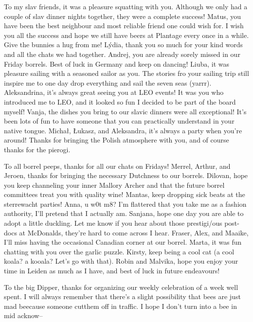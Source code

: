 \begin{thesisacknowledgements}
    To my slav friends, it was a pleasure squatting with you. Although we only had a couple of slav dinner nights together, they were a complete success! Matus, you have been the best neighbour and most reliable friend one could wish for. I wish you all the success and hope we still have beers at Plantage every once in a while. Give the bunnies a hug from me! L\'ydia, thank you so much for your kind words and all the chats we had together. Andrej, you are already sorely missed in our Friday borrels. Best of luck in Germany and keep on dancing! Liuba, it was pleasure sailing with a seasoned sailor as you. The stories fro your sailing trip still inspire me to one day drop everything and sail the seven seas (yarrr). Aleksandrina, it's always great seeing you at LEO events! It was you who introduced me to LEO, and it looked so fun I decided to be part of the board myself! Vanja, the dishes you bring to our slavic dinners were all exceptional! It's been lots of fun to have someone that you can practically understand in your native tongue.  Micha\l{}, \L{}ukasz, and Aleksandra, it's always a party when you're around! Thanks for bringing the Polish atmosphere with you, and of course thanks for the pierogi.

    To all borrel peeps, thanks for all our chats on Fridays! Merrel, Arthur, and Jeroen, thanks for bringing the necessary Dutchness to our borrels. Dilovan, hope you keep channeling your inner Mallory Archer and that the future borrel committees treat you with quality wine! Mantas, keep dropping sick beats at the sterrewacht parties! Anna, u w0t m8? I'm flattered that you take me as a fashion authority, I'll pretend that I actually am. Sanjana, hope one day you are able to adopt a little duckling. Let me know if you hear about those prestigi/ous post-docs at McDonalds, they're hard to come across I hear. Fraser, Alex, and Maaike, I'll miss having the occasional Canadian corner at our borrel. Marta, it was fun chatting with you over the garlic puzzle. Kirsty, keep being a cool cat (a cool koala? a kooala? Let's go with that). Robin and Malvika, hope you enjoy your time in Leiden as much as I have, and best of luck in future endeavours!

    To the big Dipper, thanks for organizing our weekly celebration of a week well spent. I will always remember that there's a slight possibility that bees  are just mad  beecause someone cutthem off in traffic. I hope I don't turn into a bee in mid acknow--


\end{thesisacknowledgements}
